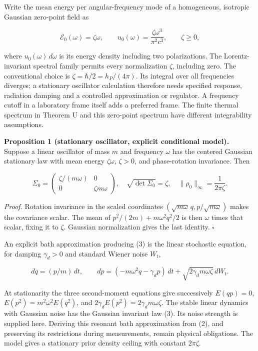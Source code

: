 \documentclass[11pt,a4paper]{article}
\begin{document}
Write the mean energy per angular-frequency mode of a homogeneous,
isotropic Gaussian zero-point field as

\[\mathcal E_0(\omega)=\zeta\omega,\qquad
u_0(\omega)=\frac{\zeta\omega^3}{\pi^2c^3},\qquad \zeta\ge0, \tag{2}\]

where \(u_0(\omega)\,d\omega\) is its energy density including two
polarizations. The Lorentz-invariant spectral family permits every
normalization \(\zeta\), including zero. The conventional choice is
\(\zeta=\hbar/2=h_P/(4\pi)\). Its integral over all frequencies
diverges; a stationary oscillator calculation therefore needs specified
response, radiation damping and a controlled approximation or regulator.
A frequency cutoff in a laboratory frame itself adds a preferred frame.
The finite thermal spectrum in Theorem U and this zero-point spectrum
have different integrability assumptions.

\textbf{Proposition 1 (stationary oscillator, explicit conditional
model).} Suppose a linear oscillator of mass \(m\) and frequency
\(\omega\) has the centered Gaussian stationary law with mean energy
\(\zeta\omega\), \(\zeta>0\), and phase-rotation invariance. Then

\[\Sigma_0=\begin{pmatrix}\zeta/(m\omega)&0\\0&\zeta m\omega\end{pmatrix},
\quad \sqrt{\det\Sigma_0}=\zeta,\quad
\|\rho_0\|_\infty=\frac1{2\pi\zeta}. \tag{3}\]

\emph{Proof.} Rotation invariance in the scaled coordinates
\((\sqrt{m\omega}\,q,p/\sqrt{m\omega})\) makes the covariance scalar.
The mean of \(p^2/(2m)+m\omega^2q^2/2\) is then \(\omega\) times that
scalar, fixing it to \(\zeta\). Gaussian normalization gives the last
identity. \(\square\)

An explicit bath approximation producing (3) is the linear stochastic
equation, for damping \(\gamma_d>0\) and standard Wiener noise \(W_t\),

\[dq=(p/m)\,dt,\qquad
dp=(-m\omega^2q-\gamma_d p)\,dt+\sqrt{2\gamma_d m\omega\zeta}\,dW_t.\]

At stationarity the three second-moment equations give successively
\(E(qp)=0\), \(E(p^2)=m^2\omega^2E(q^2)\), and
\(2\gamma_d E(p^2)=2\gamma_d m\omega\zeta\). The stable linear dynamics
with Gaussian noise has the Gaussian invariant law (3). Its noise
strength is supplied here. Deriving this resonant bath approximation
from (2), and preserving its restrictions during measurements, remain
physical obligations. The model gives a stationary prior density ceiling
with constant \(2\pi\zeta\).
\end{document}
